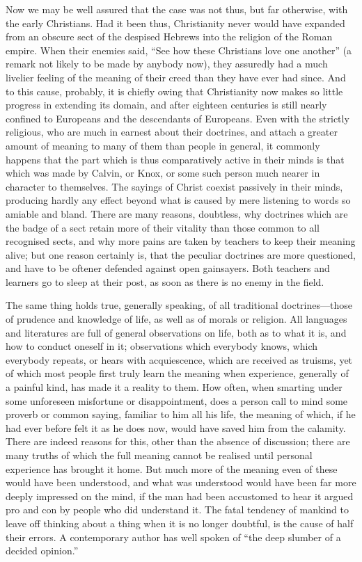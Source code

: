 \documentclass[11pt,openany]{book}
\begin{document}
Now we may be well assured that the case was not thus, but far otherwise, with the early Christians. Had it been thus, Christianity never would have expanded from an obscure sect of the despised Hebrews into the religion of the Roman empire. When their enemies said, ``See how these Christians love one another'' (a remark not likely to be made by anybody now), they assuredly had a much livelier feeling of the meaning of their creed than they have ever had since. And to this cause, probably, it is chiefly owing that Christianity now makes so little progress in extending its domain, and after eighteen centuries is still nearly confined to Europeans and the descendants of Europeans. Even with the strictly religious, who are much in earnest about their doctrines, and attach a greater amount of meaning to many of them than people in general, it commonly happens that the part which is thus comparatively active in their minds is that which was made by Calvin, or Knox, or some such person much nearer in character to themselves. The sayings of Christ coexist passively in their minds, producing hardly any effect beyond what is caused by mere listening to words so amiable and bland. There are many reasons, doubtless, why doctrines which are the badge of a sect retain more of their vitality than those common to all recognised sects, and why more pains are taken by teachers to keep their meaning alive; but one reason certainly is, that the peculiar doctrines are more questioned, and have to be oftener defended against open gainsayers. Both teachers and learners go to sleep at their post, as soon as there is no enemy in the field.

The same thing holds true, generally speaking, of all traditional doctrines---those of prudence and knowledge of life, as well as of morals or religion. All languages and literatures are full of general observations on life, both as to what it is, and how to conduct oneself in it; observations which everybody knows, which everybody repeats, or hears with acquiescence, which are received as truisms, yet of which most people first truly learn the meaning when experience, generally of a painful kind, has made it a reality to them. How often, when smarting under some unforeseen misfortune or disappointment, does a person call to mind some proverb or common saying, familiar to him all his life, the meaning of which, if he had ever before felt it as he does now, would have saved him from the calamity. There are indeed reasons for this, other than the absence of discussion; there are many truths of which the full meaning cannot be realised until personal experience has brought it home. But much more of the meaning even of these would have been understood, and what was understood would have been far more deeply impressed on the mind, if the man had been accustomed to hear it argued pro and con by people who did understand it. The fatal tendency of mankind to leave off thinking about a thing when it is no longer doubtful, is the cause of half their errors. A contemporary author has well spoken of ``the deep slumber of a decided opinion.''
\end{document}
